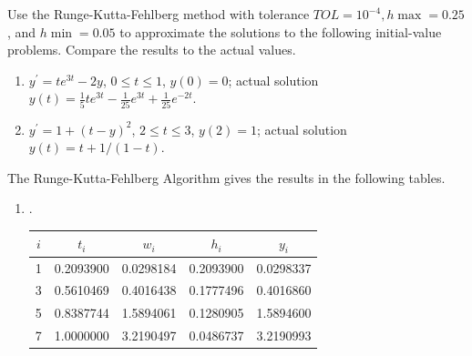 %
\begin{myexercise}%
Use the Runge-Kutta-Fehlberg method with tolerance $T O L=10^{-4}, h \max =0.25$, and $h \min =0.05$ to approximate the solutions to the following initial-value problems. Compare the results to the actual values.\\
\begin{enumerate}[label=(\alph*)]
\item $y^{\prime}=t e^{3 t}-2 y$, $0 \leq t \leq 1$, $y(0)=0$; actual solution $y(t)=\frac{1}{5} t e^{3 t}-\frac{1}{25} e^{3 t}+\frac{1}{25} e^{-2 t}$.\\
\item $y^{\prime}=1+(t-y)^{2}$, $2 \leq t \leq 3$, $y(2)=1$; actual solution $y(t)=t+1 /(1-t)$.\\
\end{enumerate}

\begin{mysolution}
The Runge-Kutta-Fehlberg Algorithm gives the results in the following tables.\\
\begin{enumerate}[label=(\alph*)]
\item. 


\begin{center}
\begin{tabular}{ccccc}
\hline
$i$ & $t_{i}$ & $w_{i}$ & $h_{i}$ & $y_{i}$ \\
\hline
1 & 0.2093900 & 0.0298184 & 0.2093900 & 0.0298337 \\
3 & 0.5610469 & 0.4016438 & 0.1777496 & 0.4016860 \\
5 & 0.8387744 & 1.5894061 & 0.1280905 & 1.5894600 \\
7 & 1.0000000 & 3.2190497 & 0.0486737 & 3.2190993 \\
\hline
\end{tabular}
\end{center}


\end{enumerate}
\end{mysolution}
\end{myexercise}
